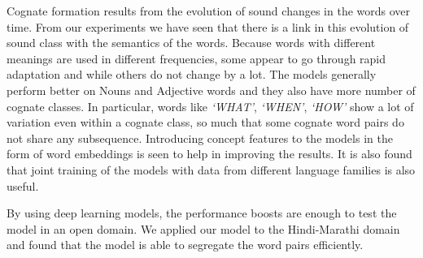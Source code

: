 \documentclass[11pt,letterpaper]{article}
\begin{document}
Cognate formation results from the evolution of sound changes in the words over time. From our experiments we have seen that there is a link in this evolution of sound class with the semantics of the words. Because words with different meanings are used in different frequencies, some appear to go through rapid adaptation and while others do not change by a lot. The models generally perform better on Nouns and Adjective words and they also have more number of cognate classes. In particular, words like \textit{`WHAT'}, \textit{`WHEN'}, \textit{`HOW'} show a lot of variation even within a cognate class, so much that some cognate word pairs do not share any subsequence. Introducing concept features to the models in the form of word embeddings is seen to help in improving the results. It is also found that joint training of the models with data from different language families is also useful.

By using deep learning models, the performance boosts are enough to test the model in an open domain. We applied our model to the Hindi-Marathi domain and found that the model is able to segregate the word pairs efficiently. 



\end{document}
